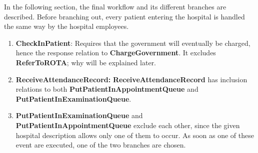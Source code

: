 In the following section, the final workflow and its different branches are described. Before branching out, every patient entering the hospital is handled the same way by the hospital employees.

\begin{enumerate}
\item \textbf{CheckInPatient}: Requires that the government will eventually be charged, hence the response relation to \textbf{ChargeGovernment}. It excludes \textbf{ReferToROTA}; why will be explained later. 
\item \textbf{ReceiveAttendanceRecord:} \textbf{ReceiveAttendanceRecord} has inclusion relations to both \textbf{PutPatientInAppointmentQueue} and \textbf{PutPatientInExaminationQueue}. 
\item \textbf{PutPatientInExaminationQueue} and \textbf{PutPatientInAppointmentQueue} exclude each other, since the given hospital description allows only one of them to occur. \newline
As soon as one of these event are executed, one of the two branches are chosen.
\end{enumerate}

